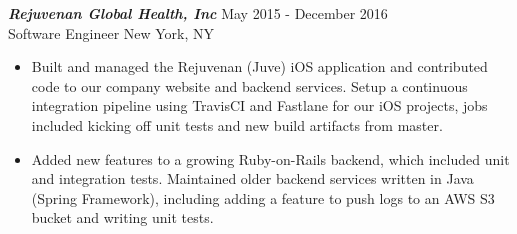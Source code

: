 {\sl \textbf{Rejuvenan Global Health, Inc}} \hfill May 2015 - December 2016 \\
Software Engineer \hfill New York, NY
\begin{itemize}
\item Built and managed the Rejuvenan (Juve) iOS application and contributed code to our company website and backend services. Setup a continuous integration pipeline using TravisCI and Fastlane for our iOS projects, jobs included kicking off unit tests and new build artifacts from master.
\item Added new features to a growing Ruby-on-Rails backend, which included unit and integration tests. Maintained older backend services written in Java (Spring Framework), including adding a feature to push logs to an AWS S3 bucket and writing unit tests.
\end{itemize}
